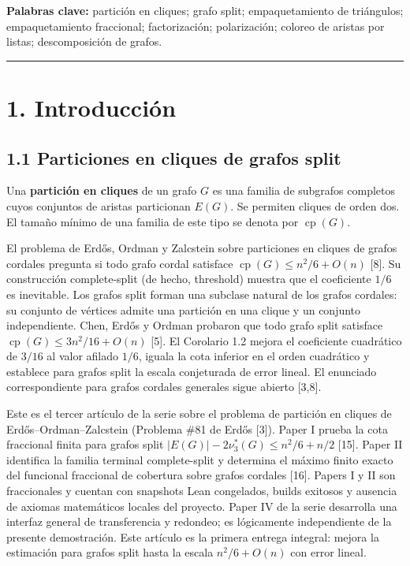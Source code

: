 \documentclass[
  spanish,
  11pt,
  a4paper,
]{article}
\begin{document}
\textbf{Palabras clave:} partición en cliques; grafo split; empaquetamiento de triángulos; empaquetamiento fraccional; factorización; polarización; coloreo de aristas por listas; descomposición de grafos.

\begin{center}\rule{0.5\linewidth}{0.5pt}\end{center}

\section{1. Introducción}\label{introducciuxf3n}

\subsection{1.1 Particiones en cliques de grafos split}\label{particiones-en-cliques-de-grafos-split}

Una \textbf{partición en cliques} de un grafo \(G\) es una familia de subgrafos completos cuyos conjuntos de aristas particionan \(E(G)\). Se permiten cliques de orden dos. El tamaño mínimo de una familia de este tipo se denota por \(\operatorname{cp}(G)\).

El problema de Erdős, Ordman y Zalcstein sobre particiones en cliques de grafos cordales pregunta si todo grafo cordal satisface \(\operatorname{cp}(G)\le n^2/6+O(n)\) {[}8{]}. Su construcción complete-split (de hecho, threshold) muestra que el coeficiente \(1/6\) es inevitable. Los grafos split forman una subclase natural de los grafos cordales: su conjunto de vértices admite una partición en una clique y un conjunto independiente. Chen, Erdős y Ordman probaron que todo grafo split satisface \(\operatorname{cp}(G)\le 3n^2/16+O(n)\) {[}5{]}. El Corolario 1.2 mejora el coeficiente cuadrático de \(3/16\) al valor afilado \(1/6\), iguala la cota inferior en el orden cuadrático y establece para grafos split la escala conjeturada de error lineal. El enunciado correspondiente para grafos cordales generales sigue abierto {[}3,8{]}.

Este es el tercer artículo de la serie sobre el problema de partición en cliques de Erdős--Ordman--Zalcstein (Problema \#81 de Erdős {[}3{]}). Paper I prueba la cota fraccional finita para grafos split \(|E(G)|-2\nu_3^*(G)\le n^2/6+n/2\) {[}15{]}. Paper II identifica la familia terminal complete-split y determina el máximo finito exacto del funcional fraccional de cobertura sobre grafos cordales {[}16{]}. Papers I y II son fraccionales y cuentan con snapshots Lean congelados, builds exitosos y ausencia de axiomas matemáticos locales del proyecto. Paper IV de la serie desarrolla una interfaz general de transferencia y redondeo; es lógicamente independiente de la presente demostración. Este artículo es la primera entrega integral: mejora la estimación para grafos split hasta la escala \(n^2/6+O(n)\) con error lineal.
\end{document}
